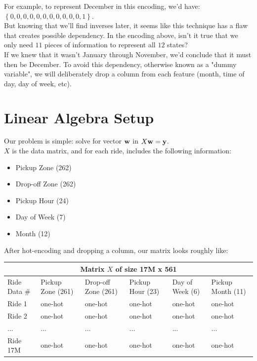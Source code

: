 \documentclass[12pt]{article}
\newcommand{\vect}[1]{\begingroup\renewcommand{\arraystretch}{0.5}\mathbf{#1}\endgroup}
\begin{document}
For example, to represent December in this encoding, we'd have: $\left\{0, 0, 0, 0, 0, 0, 0, 0, 0, 0, 0, 1\right\}$. \\

But knowing that we'll find inverses later, it seems like this technique has a flaw that creates possible dependency. In the encoding above, isn't it true that we
only need $11$ pieces of information to represent all $12$ states?\\

If we knew that it wasn't January through November, we'd conclude that it must then be December. 
To avoid this dependency, otherwise known as a "dummy variable", we will deliberately drop a column from each feature (month, time of day, day of week, etc). \\

\section*{Linear Algebra Setup}
Our problem is simple: solve for vector $\vect{w}$ in $X \vect{w} = \vect{y}$. \\

$X$ is the data matrix, and for each ride, includes the following information:
\begin{itemize}
    \item Pickup Zone (262)
    \item Drop-off Zone (262)
    \item Pickup Hour (24)
    \item Day of Week (7)
    \item Month (12)
\end{itemize}

\newpage

After hot-encoding and dropping a column, our matrix looks roughly like: \\
\begin{tabular}{|p{2.5cm}||p{2.5cm}|p{2.5cm}|p{2.5cm}|p{2.5cm}|p{2.5cm}|}
\hline
\multicolumn{6}{|c|}{Matrix $X$ of size 17M x 561} \\
\hline
Ride Data \# & Pickup Zone (261) & Drop-off Zone (261) & Pickup Hour (23) & Day of Week (6) & Pickup Month (11) \\
\hline
Ride 1 & one-hot & one-hot & one-hot & one-hot & one-hot \\
\hline
Ride 2 & one-hot & one-hot & one-hot & one-hot & one-hot \\
\hline
... & ... & ... & ... & ... & ... \\
\hline
Ride 17M & one-hot & one-hot & one-hot & one-hot & one-hot \\
\hline
\end{tabular} \newline\newline
\end{document}
